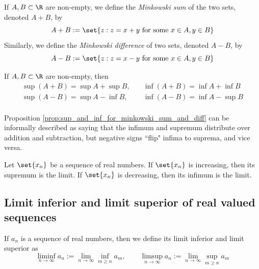 \documentclass{article} %
\begin{document}
\begin{definition}
If $A, B \subset \R$ are non-empty, we define the \textit{Minkowski sum} of the two sets, denoted $A+B$, by 
\[ A + B := \set{z : z = x + y \text{ for some } x \in A, y \in B } \]
Similarly, we define the \textit{Minkowski difference} of two sets, denoted $A-B$, by
\[ A - B := \set{z : z = x - y \text{ for some } x \in A, y \in B } \]
\label{def:minkowski_sum_and_difference}	
\end{definition}

\begin{proposition}
If $A, B \subset \R$ are non-empty, then 
\begin{align*}
\sup (A+B) = \sup A + \sup B, &\quad \inf (A+B) = \inf A + \inf B 	 \\
\sup (A-B) = \sup A - \inf B, &\quad \inf (A-B) = \inf A - \sup B 	 \\
\end{align*}

\label{prop:sup_and_inf_for_minkowski_sum_and_diff}	
\end{proposition}

\begin{remark}
Proposition \ref{prop:sup_and_inf_for_minkowski_sum_and_diff} can be informally described as saying that the infimum and supremum distribute over addition and subtraction, but negative signs ``flip" infima to suprema, and vice versa. 
\end{remark}

\begin{proposition}
Let $\set{x_n}$ be a sequence of real numbers.  If $\set{x_n}$ is increasing, then its supremum is the limit. 	If $\set{x_n}$ is decreasing, then its infimum is the limit.
\label{prop:limit_of_monotone_sequences}
\end{proposition}


\subsection{Limit inferior and limit superior of real valued sequences}

\begin{definition}
If $a_n$ is a sequence of real numbers, then  we define its limit inferior and limit superior as 
\[ \liminf_{n \to \infty} a_n := \lim_{n \to \infty} \inf_{m \geq n} a_m, \quad \quad \limsup_{n \to \infty} a_n := \lim_{n \to \infty} \sup_{m \geq n} a_m \]	
\end{definition}
\end{document}
